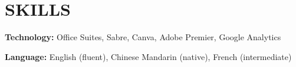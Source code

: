     \section{SKILLS}
    \begin{onecolentry}
        {\ResumeSkillFont\textbf{Technology:} Office Suites, Sabre, Canva, Adobe Premier, Google Analytics}
    \end{onecolentry}

    \begin{onecolentry}
        {\ResumeSkillFont\textbf{Language:} English (fluent), Chinese Mandarin (native), French (intermediate)}
    \end{onecolentry}
